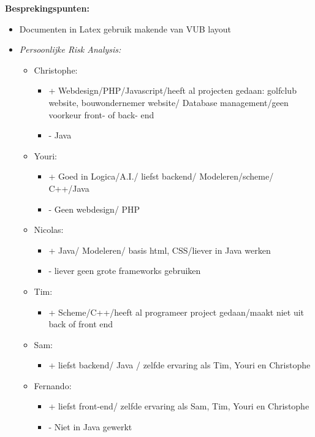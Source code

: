 \textbf{Besprekingspunten:} \\
\begin{itemize}
	\item Documenten in Latex gebruik makende van VUB layout
	\item \textit{Persoonlijke Risk Analysis:}
		\begin{itemize}
			
			\item Christophe: 
			 \begin{itemize}
			 	\item + Webdesign/PHP/Javascript/heeft al projecten gedaan: golfclub website, bouwondernemer website/ Database management/geen voorkeur front- of back- end
			 	\item - Java
			 \end{itemize} 
			 
			 \item Youri:
			 \begin{itemize}
			 	\item + Goed in Logica/A.I./ liefst backend/ Modeleren/scheme/ C++/Java
			 	\item - Geen webdesign/ PHP
			 \end{itemize}
			 
			 \item Nicolas:
			 \begin{itemize}
			 	\item + Java/ Modeleren/ basis html, CSS/liever in Java werken
			 	\item - liever geen grote frameworks gebruiken
			 \end{itemize}
			 
			 \item Tim:
			 \begin{itemize}
			 	\item + Scheme/C++/heeft al programeer project gedaan/maakt niet uit back of front end
			 \end{itemize}
			 
			 \item Sam:
			 \begin{itemize}
			 	\item + liefst backend/ Java / zelfde ervaring als Tim, Youri en Christophe
			 \end{itemize}
			 
			 \item Fernando:
			 \begin{itemize}
			 	\item + liefst front-end/ zelfde ervaring als Sam, Tim, Youri en Christophe
			 	\item - Niet in Java gewerkt
			 \end{itemize}
			 

\end{itemize}
\end{itemize}
